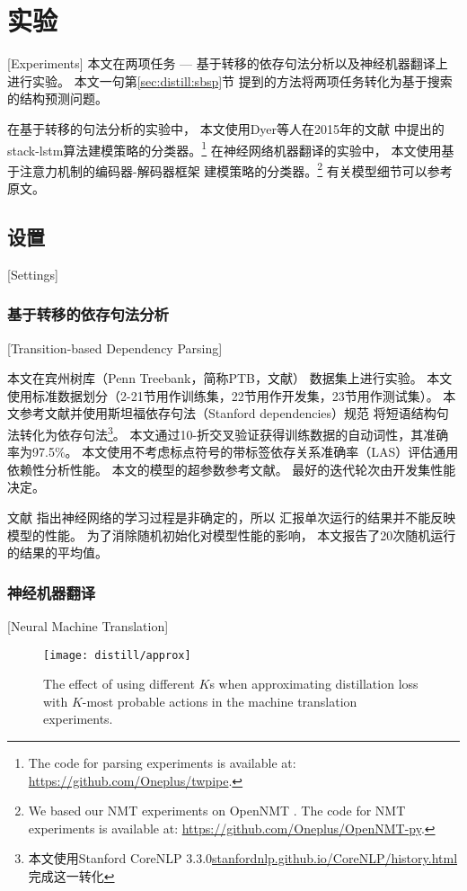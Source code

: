 \section{实验}[Experiments]\label{sec:distill:vani-exp}
本文在两项任务 --- 基于转移的依存句法分析以及神经机器翻译上进行实验。
本文一句第\ref{sec:distill:sbsp}节
提到的方法将两项任务转化为基于搜索的结构预测问题。

在基于转移的句法分析的实验中，
本文使用Dyer等人在2015年的文献\cite{dyer-EtAl:2015:ACL-IJCNLP}
中提出的stack-lstm算法建模策略的分类器。\footnote{The code for parsing experiments is available at: \url{https://github.com/Oneplus/twpipe}.}
在神经网络机器翻译的实验中，
本文使用基于注意力机制的编码器-解码器框架\cite{luong-pham-manning:2015:EMNLP}
建模策略的分类器。\footnote{We based our NMT experiments on OpenNMT \cite{klein-EtAl:2017:ACL-2017-System-Demonstrations}. 
	The code for NMT experiments is available at: \url{https://github.com/Oneplus/OpenNMT-py}.}
有关模型细节可以参考原文。

\subsection{设置}[Settings]
\subsubsection{基于转移的依存句法分析}[Transition-based Dependency Parsing]

本文在宾州树库（Penn Treebank，简称PTB，文献\cite{Marcus93buildinga}）
数据集上进行实验。
本文使用标准数据划分（2-21节用作训练集，22节用作开发集，23节用作测试集）。
本文参考文献\cite{dyer-EtAl:2015:ACL-IJCNLP}并使用斯坦福依存句法（Stanford dependencies）规范
将短语结构句法转化为依存句法\footnote{本文使用Stanford CoreNLP 3.3.0\url{stanfordnlp.github.io/CoreNLP/history.html}完成这一转化}。
本文通过10-折交叉验证获得训练数据的自动词性，其准确率为97.5\%。
本文使用不考虑标点符号的带标签依存关系准确率（LAS）评估通用依赖性分析性能。
本文的模型的超参数参考文献。
最好的迭代轮次由开发集性能决定。

文献
指出神经网络的学习过程是非确定的，所以
汇报单次运行的结果并不能反映模型的性能。
为了消除随机初始化对模型性能的影响，
本文报告了20次随机运行的结果的平均值。

\subsubsection{神经机器翻译}[Neural Machine Translation]
\begin{figure}[t]
	\centering
	\texttt{[image: distill/approx]}
	\caption{The effect of using different $K$s when approximating
		distillation loss with $K$-most probable actions in the machine translation experiments.}\label{fig:distill:approx}
\end{figure}

